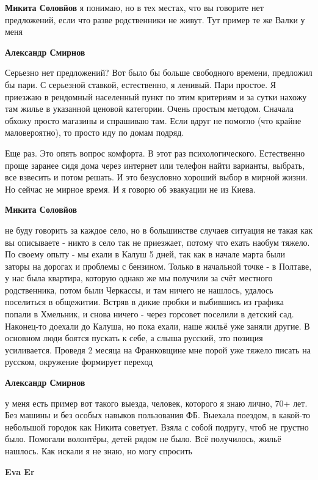 \begin{itemize}
\begin{itemize}
\textbf{Микита Соловйов} я понимаю, но в тех местах, что вы говорите нет предложений, если что разве родственники не живут. Тут пример те же Валки у меня

\textbf{Александр Смирнов} 

Серьезно нет предложений? Вот было бы больше свободного времени, предложил бы
пари. С серьезной ставкой, естественно, я ленивый. Пари простое. Я приезжаю в
рендомный населенный пункт по этим критериям и за сутки нахожу там жилье в
указанной ценовой категории. Очень простым методом. Сначала обхожу просто
магазины и спрашиваю там. Если вдруг не помогло (что крайне маловероятно), то
просто иду по домам подряд.

Еще раз. Это опять вопрос комфорта. В этот раз психологического. Естественно
проще заранее сидя дома через интернет или телефон найти варианты, выбрать, все
взвесить и потом решать. И это безусловно хороший выбор в мирной жизни. Но
сейчас не мирное время. И я говорю об эвакуации не из Киева.

\textbf{Микита Соловйов} 

не буду говорить за каждое село, но в большинстве случаев ситуация не такая как
вы описываете - никто в село так не приезжает, потому что ехать наобум тяжело.
По своему опыту - мы ехали в Калуш 5 дней, так как в начале марта были заторы
на дорогах и проблемы с бензином. Только в начальной точке - в Полтаве, у нас
была квартира, которую однако же мы получили за счёт местного родственника,
потом были Черкассы, и там ничего не нашлось, удалось поселиться в общежитии.
Встряв в дикие пробки и выбившись из графика попали в Хмельник, и снова ничего
- через горсовет поселили в детский сад. Наконец-то доехали до Калуша, но пока
ехали, наше жильё уже заняли другие. В основном люди боятся пускать к себе, а
слыша русский, это позиция усиливается. Проведя 2 месяца на Франковщине мне
порой уже тяжело писать на русском, окружение формирует переход

\textbf{Александр Смирнов} 

у меня есть пример вот такого выезда, человек, которого я знаю лично, 70+ лет.
Без машины и без особых навыков пользования ФБ. Выехала поездом, в какой-то
небольшой городок как Никита советует. Взяла с собой подругу, чтоб не грустно
было. Помогали волонтёры, детей рядом не было. Всё получилось, жильё нашлось.
Как искали я не знаю, но могу спросить

\textbf{Eva Er} 


\end{itemize}
\end{itemize}
